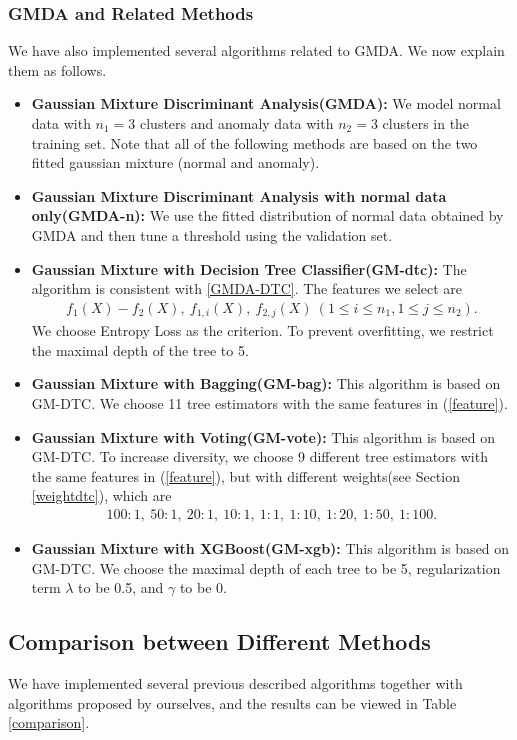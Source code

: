\documentclass[english]{article}
\newenvironment{eqt}{\begin{equation}\begin{aligned}}{\end{aligned}\end{equation}}
\begin{document}
\subsubsection{GMDA and Related Methods}
\par We have also implemented several algorithms related to GMDA. We now explain them as follows.
\begin{itemize}
\item \textbf{Gaussian Mixture Discriminant Analysis(GMDA): } We model normal data with $n_1=3$ clusters and anomaly data with $n_2=3$ clusters in the training set. Note that all of the following methods are based on the two fitted gaussian mixture (normal and anomaly). 
\item \textbf{Gaussian Mixture Discriminant Analysis with normal data only(GMDA-n): } We use the fitted distribution of normal data obtained by GMDA and then tune a threshold using the validation set.
\item \textbf{Gaussian Mixture with Decision Tree Classifier(GM-dtc): } The algorithm is consistent with \ref{GMDA-DTC}. The features we select are
\begin{eqt}
\label{feature}
f_1(X) - f_2(X), \ f_{1, i}(X), \ f_{2, j}(X)\ (1\leqslant i\leqslant n_1, 1\leqslant j\leqslant n_2).
\end{eqt}
We choose Entropy Loss as the criterion. To prevent overfitting, we restrict the maximal depth of the tree to 5. 
\item \textbf{Gaussian Mixture with Bagging(GM-bag): } This algorithm is based on GM-DTC. We choose 11 tree estimators with the same features in (\ref{feature}). 
\item \textbf{Gaussian Mixture with Voting(GM-vote): } This algorithm is based on GM-DTC. To increase diversity, we choose 9 different tree estimators with the same features in (\ref{feature}), but with different weights(see Section \ref{weightdtc}), which are
\begin{eqt}
100:1,\ 50:1,\ 20:1,\ 10:1,\ 1:1,\ 1:10,\ 1:20,\ 1:50,\ 1:100.
\end{eqt}
\item \textbf{Gaussian Mixture with XGBoost(GM-xgb): } This algorithm is based on GM-DTC. We choose the maximal depth of each tree to be 5, regularization term $\lambda$ to be 0.5, and $\gamma$ to be 0.

\end{itemize}

\subsection{Comparison between Different Methods}
\par We have implemented several previous described algorithms together with algorithms proposed by ourselves, and the results can be viewed in Table \ref{comparison}.
\end{document}
